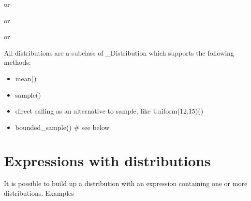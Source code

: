 \documentclass[letterpaper,10pt,english]{sphinxmanual}
\begin{document}
or

\begin{sphinxVerbatim}[commandchars=\\\{\}]
 
\end{sphinxVerbatim}

or

\begin{sphinxVerbatim}[commandchars=\\\{\}]
 
\end{sphinxVerbatim}

or

\begin{sphinxVerbatim}[commandchars=\\\{\}]
 
\end{sphinxVerbatim}

All distributions are a subclass of \_Distribution which supports the following methods:
\begin{itemize}
\item {} 
mean()

\item {} 
sample()

\item {} 
direct calling as an alternative to sample, like Uniform(12,15)()

\item {} 
bounded\_sample()  \# see below

\end{itemize}


\section{Expressions with distributions}
\label{\detokenize{Distributions:expressions-with-distributions}}
It is possible to build up a distribution with an expression containing one or more distributions. Examples
\end{document}
